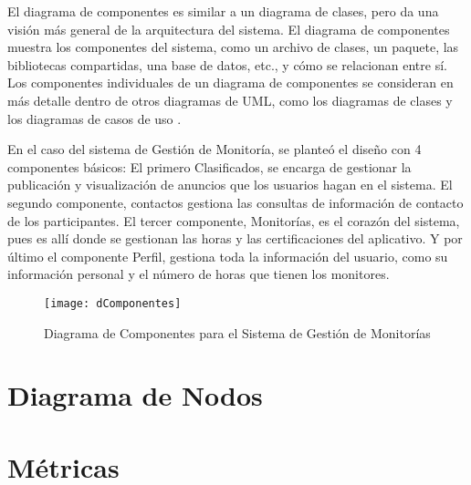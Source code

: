 El diagrama de componentes es similar a un diagrama de clases, pero da una visión más
general de la arquitectura del sistema. El diagrama de componentes muestra los componentes
del sistema, como un archivo de clases, un paquete, las bibliotecas compartidas, una base
de datos, etc., y cómo se relacionan entre sí. Los componentes individuales de un diagrama de
componentes se consideran en más detalle dentro de otros diagramas de UML, como los
diagramas de clases y los diagramas de casos de uso \cite{Kendall_2005}.

En el caso del sistema de Gestión de Monitoría, se planteó el diseño con 4 componentes básicos: El primero Clasificados, se encarga de gestionar la publicación y visualización de anuncios que los usuarios hagan en el sistema. El segundo componente, contactos gestiona las consultas de información de contacto de los participantes. El tercer componente, Monitorías, es el corazón del sistema, pues es allí donde se gestionan las horas y las certificaciones del aplicativo. Y por último el componente Perfil, gestiona toda la información del usuario, como su información personal y el número de horas que tienen los monitores.

\begin{figure}[H]
	\centering
	\texttt{[image: dComponentes]}
	\centering
	\caption{Diagrama de Componentes para el Sistema de Gestión de Monitorías}
	\label{fig:dcomponentes}
\end{figure}
\newpage


\section{Diagrama de Nodos}

\newpage


\section{Métricas}

